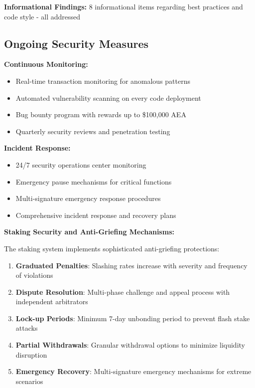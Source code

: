 \documentclass[12pt,a4paper]{article}
\begin{document}
\textbf{Informational Findings:} 8 informational items regarding best practices and code style - all addressed

\subsection{Ongoing Security Measures}

\textbf{Continuous Monitoring:}
\begin{itemize}
\item Real-time transaction monitoring for anomalous patterns
\item Automated vulnerability scanning on every code deployment
\item Bug bounty program with rewards up to \$100,000 AEA
\item Quarterly security reviews and penetration testing
\end{itemize}

\textbf{Incident Response:}
\begin{itemize}
\item 24/7 security operations center monitoring
\item Emergency pause mechanisms for critical functions
\item Multi-signature emergency response procedures
\item Comprehensive incident response and recovery plans
\end{itemize}

\textbf{Staking Security and Anti-Griefing Mechanisms:}

The staking system implements sophisticated anti-griefing protections:

\begin{enumerate}
\item \textbf{Graduated Penalties}: Slashing rates increase with severity and frequency of violations
\item \textbf{Dispute Resolution}: Multi-phase challenge and appeal process with independent arbitrators
\item \textbf{Lock-up Periods}: Minimum 7-day unbonding period to prevent flash stake attacks
\item \textbf{Partial Withdrawals}: Granular withdrawal options to minimize liquidity disruption
\item \textbf{Emergency Recovery}: Multi-signature emergency mechanisms for extreme scenarios
\end{enumerate}
\end{document}
